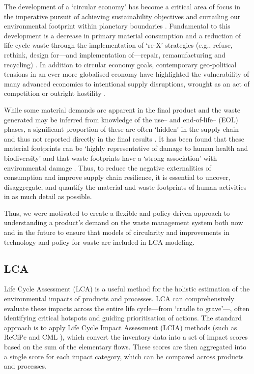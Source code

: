 
The development of a `circular economy' has become a critical area of focus in the imperative pursuit of achieving sustainability objectives and curtailing our environmental footprint within planetary boundaries \citep{eu2019greendeal, eu2020circ,nl2023ceplan,nl2016ceplan,pardo2018ce,ellenmacarthur2015ce}. Fundamental to this development is a decrease in primary material consumption and a reduction of life cycle waste through the implementation of `re-X' strategies (e.g., refuse, rethink, design for---and implementation of---repair, remanufacturing and recycling) \citep{eu2022ecodesign, eu2022repair,eu2015reman}. In addition to circular economy goals, contemporary geo-political tensions in an ever more globalised economy have highlighted the vulnerability of many advanced economies to intentional supply disruptions, wrought as an act of competition or outright hostility \citep{jrc2023supplychain,hartley2024cepolitics,berry2023crm}.

While some material demands are apparent in the final product and the waste generated may be inferred from knowledge of the use-- and end-of-life-- (EOL) phases, a significant proportion of these are often `hidden' in the supply chain and thus not reported directly in the final results \citep{laurenti2016wastefootprint,salviulo2021supplychain}. It has been found that these material footprints can be `highly representative of damage to human health and biodiversity' \citep{steinmann2017resourcefootprints} and that waste footprints have a `strong association' with environmental damage \citep{laurenti2023wastefootprint}. Thus, to reduce the negative externalities of consumption and improve supply chain resilience, it is essential to uncover, disaggregate, and quantify the material and waste footprints of human activities in as much detail as possible.

Thus, we were motivated to create a flexible and policy-driven approach to understanding a product’s demand on the waste management system both now and in the future to ensure that models of circularity and improvements in technology and policy for waste are included in LCA modeling.

\subsection{LCA}

Life Cycle Assessment (LCA) is a useful method for the holistic estimation of the environmental impacts of products and processes. LCA can comprehensively evaluate these impacts across the entire life cycle---from `cradle to grave'---, often identifying critical hotspots and guiding prioritisation of actions. The standard approach is to apply Life Cycle Impact Assessment (LCIA) methods (such as ReCiPe \citep{huijbregts2016recipe} and CML \citep{guinee2002cml}), which convert the inventory data into a set of impact scores based on the sum of the elementary flows. These scores are then aggregated into a single score for each impact category, which can be compared across products and processes.

